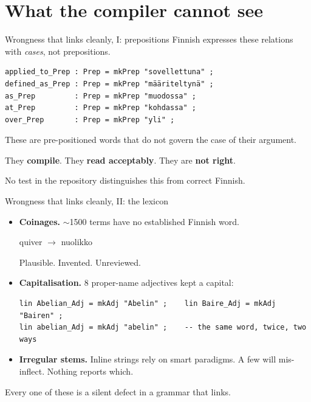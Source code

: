 \documentclass[10pt,aspectratio=169]{beamer}
\begin{document}
\section{What the compiler cannot see}

\begin{frame}[fragile]{Wrongness that links cleanly, I: prepositions}
  Finnish expresses these relations with \emph{cases}, not prepositions.

\begin{lstlisting}
applied_to_Prep : Prep = mkPrep "sovellettuna" ;
defined_as_Prep : Prep = mkPrep "määriteltynä" ;
as_Prep         : Prep = mkPrep "muodossa" ;
at_Prep         : Prep = mkPrep "kohdassa" ;
over_Prep       : Prep = mkPrep "yli" ;
\end{lstlisting}

  \vspace{0.5em}
  These are pre-positioned words that do not govern the case of their argument.

  \vspace{0.5em}
  They \textbf{compile}. They \textbf{read acceptably}. They are \textbf{not right}.

  \vspace{0.5em}
  \small
  No test in the repository distinguishes this from correct Finnish.
\end{frame}

\begin{frame}[fragile]{Wrongness that links cleanly, II: the lexicon}
  \begin{itemize}
    \item \textbf{Coinages.} $\sim$1500 terms have no established Finnish word.
      \begin{center}\ttfamily\small
      quiver $\longrightarrow$ nuolikko
      \end{center}
      Plausible. Invented. Unreviewed.
    \item \textbf{Capitalisation.} 8 proper-name adjectives kept a capital:
\begin{lstlisting}
lin Abelian_Adj = mkAdj "Abelin" ;    lin Baire_Adj = mkAdj "Bairen" ;
lin abelian_Adj = mkAdj "abelin" ;    -- the same word, twice, two ways
\end{lstlisting}
    \item \textbf{Irregular stems.} Inline strings rely on smart paradigms.
      A few will mis-inflect. Nothing reports which.
  \end{itemize}

  \vspace{0.5em}
  \begin{center}
  \alert{Every one of these is a silent defect in a grammar that links.}
  \end{center}
\end{frame}
\end{document}

